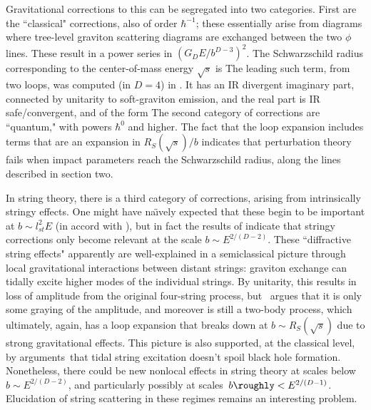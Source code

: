 Gravitational corrections to this can be segregated into two categories.  First are the ``classical" corrections, also of order $\hbar^{-1}$; these essentially arise from diagrams where tree-level graviton scattering diagrams are exchanged between the two $\phi$ lines.  These result in a power series  in $(G_DE/b^{D-3})^2$.  The Schwarzschild radius corresponding to the center-of-mass energy $\sqrt s$ is 
%
\eqn{}
%
The leading such term, from two loops, was computed (in $D=4$) in \ACVfour.  It has an IR divergent imaginary part, connected by unitarity to soft-graviton emission, and the real part is IR safe/convergent, and of the form
%
\eqn{}
%
The second category of corrections are ``quantum," with powers $\hbar^0$ and higher.  The fact that the loop expansion includes terms that are an expansion in $R_S(\sqrt s)/b$ indicates that perturbation theory fails when impact parameters reach the Schwarzschild radius, along the lines described in section two.


In string theory, there is a third category of corrections, arising from intrinsically stringy effects.  One might have na\"\i vely expected that these begin to be important at $b\sim l_{st}^2 E$ (in accord with \genunc), but in fact the results of  indicate that stringy corrections only become relevant at the scale $b\sim E^{2/(D-2)}$.  These ``diffractive string effects" 
apparently are well-explained in a semiclassical picture through
 local gravitational interactions between distant strings\LQGST:  graviton exchange can tidally excite higher modes of the individual strings.  By unitarity, this results in loss of amplitude from the original four-string process, but \ACVtwo\ argues that it is only some graying of the amplitude, and moreover is still a two-body process, which ultimately, again, has a loop expansion that breaks down at $b\sim R_S(\sqrt s)$ due to strong gravitational effects.  This picture is also supported, at the classical level, by arguments\LQGST\ that tidal string excitation doesn't spoil black hole formation.  Nonetheless, there could be new nonlocal effects in string theory at scales below $b\sim E^{2/(D-2)}$, and particularly possibly at scales\LQGST\ $b\roughly< E^{2/(D-1)}$.  Elucidation of string scattering in these regimes remains an interesting problem.

